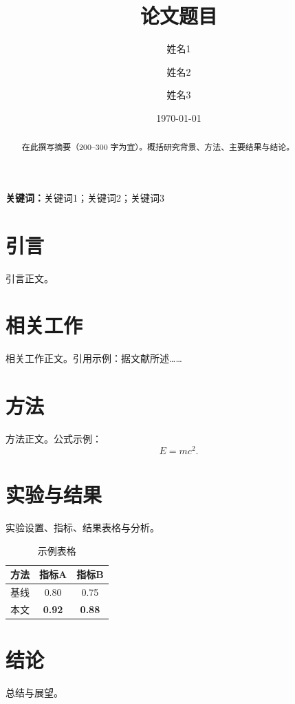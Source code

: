 \documentclass[12pt,a4paper]{article}
\title{论文题目}
\author{姓名1 \and 姓名2 \and 姓名3}
\date{\today}
\begin{document}
\maketitle

\begin{abstract}
在此撰写摘要（200--300 字为宜）。概括研究背景、方法、主要结果与结论。
\end{abstract}

\textbf{关键词：}关键词1；关键词2；关键词3

\section{引言}
引言正文。

\section{相关工作}
相关工作正文。引用示例：据文献\cite{example2024}所述……

\section{方法}
方法正文。公式示例：
\begin{equation}
  E = mc^2.
\end{equation}

\section{实验与结果}
实验设置、指标、结果表格与分析。

\begin{table}[htbp]
  \centering
  \caption{示例表格}
  \begin{tabular}{lcc}
    \toprule
    方法 & 指标A & 指标B \\
    \midrule
    基线 & 0.80 & 0.75 \\
    本文 & \textbf{0.92} & \textbf{0.88} \\
    \bottomrule
  \end{tabular}
\end{table}

\section{结论}
总结与展望。



\end{document}
